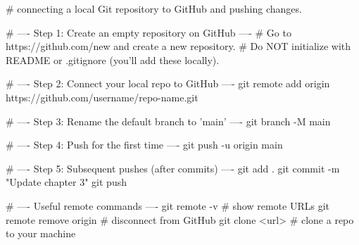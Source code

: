 # connecting a local Git repository to GitHub and pushing changes.

# ---- Step 1: Create an empty repository on GitHub ----
# Go to https://github.com/new and create a new repository.
# Do NOT initialize with README or .gitignore (you'll add these locally).

# ---- Step 2: Connect your local repo to GitHub ----
git remote add origin https://github.com/username/repo-name.git

# ---- Step 3: Rename the default branch to 'main' ----
git branch -M main

# ---- Step 4: Push for the first time ----
git push -u origin main

# ---- Step 5: Subsequent pushes (after commits) ----
git add .
git commit -m "Update chapter 3"
git push

# ---- Useful remote commands ----
git remote -v              # show remote URLs
git remote remove origin   # disconnect from GitHub
git clone <url>            # clone a repo to your machine
